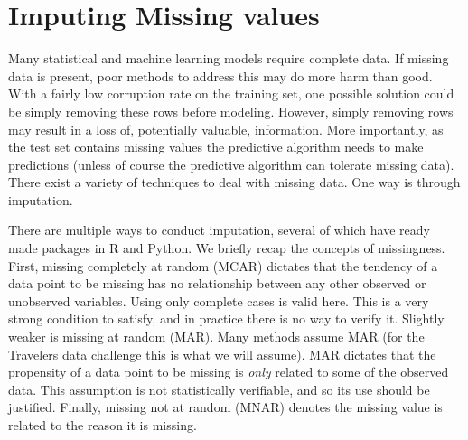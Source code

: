 \documentclass[11pt]{article}
\theoremstyle{remark}
\theoremstyle{definition}
\begin{document}
\section{Imputing Missing values}
Many statistical and machine learning models require complete data. If missing data is present, poor methods to address this may do more harm than good. With a fairly low corruption rate on the training set, one possible solution could be simply removing these rows before modeling. However, simply removing rows may result in a loss of, potentially valuable, information. More importantly, as the test set contains missing values the predictive algorithm needs to make predictions (unless of course the predictive algorithm can tolerate missing data). There exist a variety of techniques to deal with missing data. One way is through imputation.

There are multiple ways to conduct imputation, several of which have ready made packages in R and Python. We briefly recap the concepts of missingness. First, missing completely at random (MCAR) dictates that the tendency of a data point to be missing has no relationship between any other observed or unobserved variables. Using only complete cases is valid here. This is a very strong condition to satisfy, and in practice there is no way to verify it. Slightly weaker is missing at random (MAR). Many methods assume MAR (for the Travelers data challenge this is what we will assume). MAR dictates that the propensity of a data point to be missing is \textit{only} related to some of the observed data. This assumption is not statistically verifiable, and so its use should be justified. Finally, missing not at random (MNAR) denotes the missing value is related to the reason it is missing. 
\end{document}
